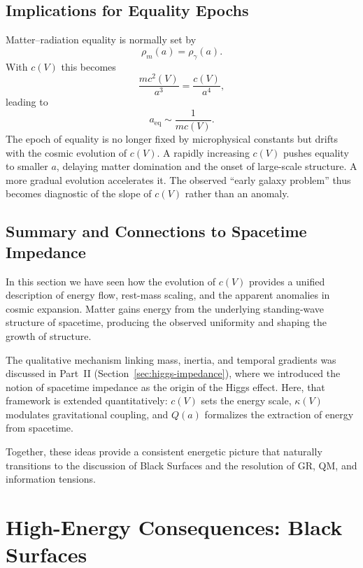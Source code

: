 \documentclass[12pt]{article}
\begin{document}
\subsection{Implications for Equality Epochs}

Matter–radiation equality is normally set by
\begin{equation}
\rho_{m}(a) = \rho_{\gamma}(a) .
\end{equation}
With $c(V)$ this becomes
\begin{equation}
\frac{m c^{2}(V)}{a^{3}} = \frac{c(V)}{a^{4}} ,
\end{equation}
leading to
\begin{equation}
a_{\text{eq}} \sim \frac{1}{m c(V)} .
\end{equation}
The epoch of equality is no longer fixed by microphysical constants but drifts with the cosmic evolution of $c(V)$. A rapidly increasing $c(V)$ pushes equality to smaller $a$, delaying matter domination and the onset of large-scale structure. A more gradual evolution accelerates it. The observed ``early galaxy problem'' thus becomes diagnostic of the slope of $c(V)$ rather than an anomaly.

\subsection{Summary and Connections to Spacetime Impedance}

In this section we have seen how the evolution of $c(V)$ provides a unified description of energy flow, rest-mass scaling, and the apparent anomalies in cosmic expansion. Matter gains energy from the underlying standing-wave structure of spacetime, producing the observed uniformity and shaping the growth of structure. 

The qualitative mechanism linking mass, inertia, and temporal gradients was discussed in Part~II (Section~\ref{sec:higgs-impedance}), where we introduced the notion of spacetime impedance as the origin of the Higgs effect. Here, that framework is extended quantitatively: $c(V)$ sets the energy scale, $\kappa(V)$ modulates gravitational coupling, and $Q(a)$ formalizes the extraction of energy from spacetime.

Together, these ideas provide a consistent energetic picture that naturally transitions to the discussion of Black Surfaces and the resolution of GR, QM, and information tensions.


\section{High-Energy Consequences: Black Surfaces}
\end{document}

